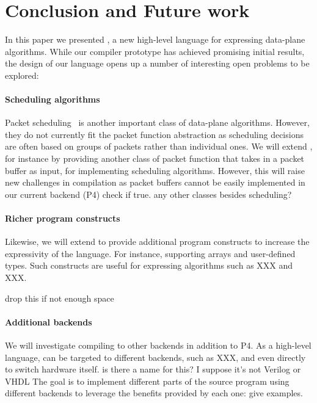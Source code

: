\section{Conclusion and Future work}
\label{s:future}

In this paper we presented \pktlanguage, a new high-level language for expressing 
data-plane
algorithms. While our compiler prototype has achieved promising initial results, 
the design of our language opens up 
a number of interesting open problems to be explored:

\paragraph{Scheduling algorithms}
Packet scheduling~\cite{XXX, XXX} is another important class of data-plane algorithms.
However, they do not currently fit the \pktlanguage packet function abstraction
as scheduling decisions are often based on groups of packets rather than individual
ones. We will extend \pktlanguage, for instance by providing another class of packet
function that takes in a packet buffer as input, for implementing scheduling algorithms.
However, this will raise new challenges in compilation as packet buffers cannot be
easily implemented in our current backend (P4) \ac{check if true}.
\ac{any other classes besides scheduling?}

\paragraph{Richer program constructs}
Likewise, we will extend \pktlanguage to provide additional program constructs
to increase the expressivity of the language. For instance, supporting 
arrays and user-defined types. Such constructs are useful for expressing 
algorithms such as XXX and XXX.

\ac{drop this if not enough space}
\paragraph{Additional backends}
We will investigate compiling \pktlanguage to other backends in addition to P4. 
As a high-level language, \pktlanguage can be targeted to different backends, 
such as XXX, and even directly 
to switch hardware itself. \ac{is there a name for this? I suppose
it's not Verilog or VHDL} The goal is to implement different parts of the source 
program using different backends to leverage the benefits provided by each one:
\ac{give examples}.


